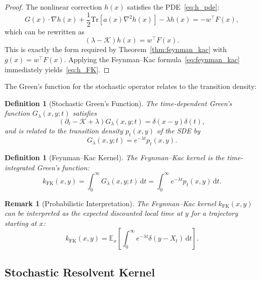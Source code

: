 \documentclass[11pt,a4paper]{article}
\newtheorem{definition}[theorem]{Definition}
\newtheorem{remark}[theorem]{Remark}
\newcommand{\E}{\mathbb{E}}
\newcommand{\Tr}{\mathrm{Tr}}
\newcommand{\dt}{\,\mathrm{d}t}
\newcommand{\Koop}{\mathcal{K}}
\begin{document}
\begin{proof}
The nonlinear correction $h(x)$ satisfies the PDE~\eqref{eq:h_pde}:
\begin{equation}
G(x) \cdot \nabla h(x) + \frac{1}{2}\Tr[a(x) \nabla^2 h(x)] - \lambda h(x) = -w^\top F(x),
\end{equation}
which can be rewritten as
\begin{equation}
(\lambda - \Koop)h(x) = w^\top F(x).
\end{equation}
This is exactly the form required by Theorem~\ref{thm:feynman_kac} with $g(x) = w^\top F(x)$. Applying the Feynman--Kac formula~\eqref{eq:feynman_kac} immediately yields~\eqref{eq:h_FK}.
\end{proof}

The Green's function for the stochastic operator relates to the transition density:

\begin{definition}[Stochastic Green's Function]
The time-dependent Green's function $G_\lambda(x,y;t)$ satisfies
\begin{equation}
(\partial_t - \Koop + \lambda) G_\lambda(x,y;t) = \delta(x-y)\delta(t),
\end{equation}
and is related to the transition density $p_t(x,y)$ of the SDE by
\begin{equation}
G_\lambda(x,y;t) = e^{-\lambda t} p_t(x,y).
\end{equation}
\end{definition}

\begin{definition}[Feynman--Kac Kernel]\label{def:FK_kernel}
The Feynman--Kac kernel is the time-integrated Green's function:
\begin{equation}\label{eq:FK_kernel}
k_{\mathrm{FK}}(x,y) = \int_0^\infty G_\lambda(x,y;t) \dt = \int_0^\infty e^{-\lambda t} p_t(x,y) \dt.
\end{equation}
\end{definition}

\begin{remark}[Probabilistic Interpretation]
The Feynman--Kac kernel $k_{\mathrm{FK}}(x,y)$ can be interpreted as the expected discounted local time at $y$ for a trajectory starting at $x$:
\begin{equation}
k_{\mathrm{FK}}(x,y) = \E_x\left[\int_0^\infty e^{-\lambda t} \delta(y - X_t) \dt\right].
\end{equation}
\end{remark}

\subsection{Stochastic Resolvent Kernel}
\end{document}
